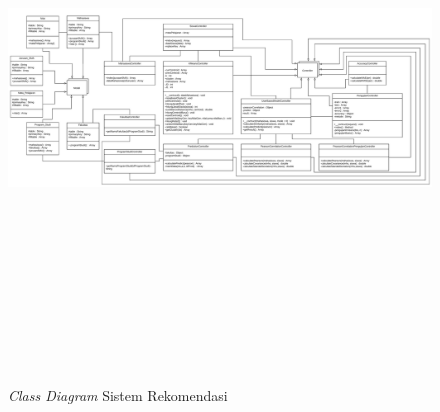\begin{figure}[H]
    \centering
    \includegraphics[width = 20cm, height = 15cm, angle = 90]{doc/DokumenSkripsi/Gambar/gambar45.png}
    \caption{\textit{Class Diagram} Sistem Rekomendasi}
    \label{fig:class diagram sistem rekomendasi}
\end{figure}